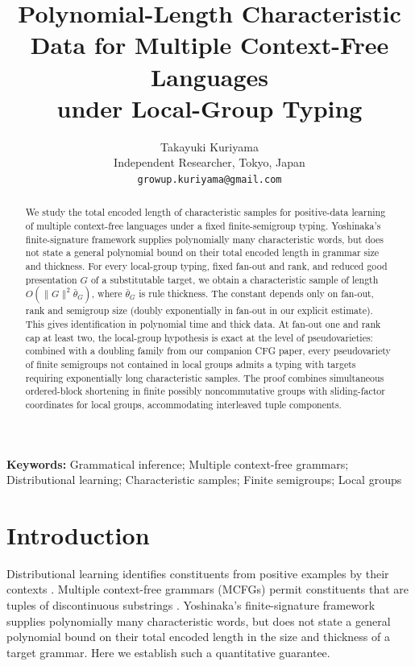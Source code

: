 \documentclass[11pt]{article}
\title{Polynomial-Length Characteristic Data for Multiple Context-Free Languages\\under Local-Group Typing}
\author{Takayuki Kuriyama\\
Independent Researcher, Tokyo, Japan\\
\texttt{growup.kuriyama@gmail.com}}
\date{}
\numberwithin{equation}{section}
\theoremstyle{plain}
\theoremstyle{definition}
\theoremstyle{remark}
\theoremstyle{plain}
\begin{document}
\maketitle

\begin{abstract}
We study the total encoded length of characteristic samples for positive-data
learning of multiple context-free languages under a fixed finite-semigroup
typing. Yoshinaka's finite-signature framework supplies polynomially many
characteristic words, but does not state a general polynomial bound on
their total encoded length in grammar size and thickness.
For every local-group typing, fixed fan-out and rank, and reduced good
presentation $G$ of a substitutable target, we obtain a characteristic
sample of length $O(\|G\|^2\bar\theta_G)$, where $\bar\theta_G$ is
rule thickness. The constant depends only on fan-out, rank and semigroup
size (doubly exponentially in fan-out in our explicit estimate).
This gives identification in polynomial time and thick data.
At fan-out one and rank cap at least two, the local-group
hypothesis is exact at the level of pseudovarieties: combined with
a doubling family from our companion CFG paper, every pseudovariety
of finite semigroups not contained in local groups admits a typing
with targets requiring exponentially long characteristic samples.
The proof combines simultaneous ordered-block shortening in finite
possibly noncommutative groups with sliding-factor coordinates for
local groups, accommodating interleaved tuple components.
\end{abstract}

\noindent\textbf{Keywords:} Grammatical inference; Multiple context-free
grammars; Distributional learning; Characteristic samples; Finite
semigroups; Local groups
\par\medskip

\section{Introduction}
\label{sec:introduction}
Distributional learning identifies constituents from positive examples by
their contexts \cite{Gold1967,Angluin1980,ClarkEyraud2007}. Multiple
context-free grammars (MCFGs) permit constituents that are tuples of
discontinuous substrings \cite{SekiEtAl1991,Yoshinaka2009,Yoshinaka2011}.
Yoshinaka's finite-signature framework
\cite[Theorem~1 and Lemmas~2--3]{Yoshinaka2015General}
supplies polynomially many characteristic words, but does not state
a general polynomial bound on their total encoded length in the size and
thickness of a target grammar. Here we establish such a quantitative guarantee.
\end{document}
